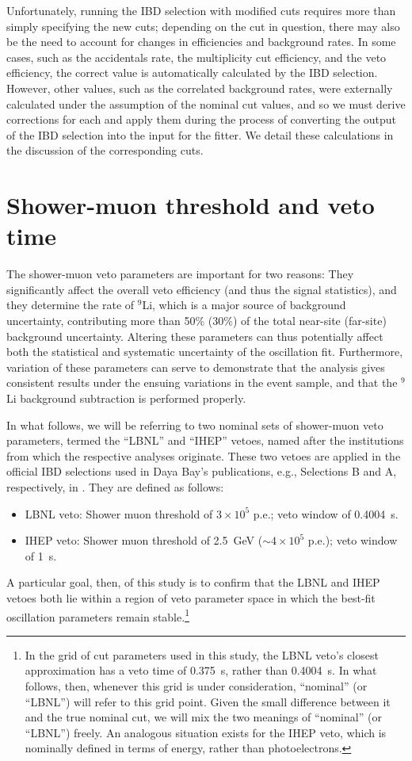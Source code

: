\documentclass[../thesis.tex]{subfiles}
\begin{document}
Unfortunately, running the IBD selection with modified cuts requires more than simply specifying the new cuts; depending on the cut in question, there may also be the need to account for changes in efficiencies and background rates. In some cases, such as the accidentals rate, the multiplicity cut efficiency, and the veto efficiency, the correct value is automatically calculated by the IBD selection. However, other values, such as the correlated background rates, were externally calculated under the assumption of the nominal cut values, and so we must derive corrections for each and apply them during the process of converting the output of the IBD selection into the input for the fitter. We detail these calculations in the discussion of the corresponding cuts.

\section{Shower-muon threshold and veto time}
\label{sec:cutVaryShowerMuon}

The shower-muon veto parameters are important for two reasons: They significantly affect the overall veto efficiency (and thus the signal statistics), and they determine the rate of $^9$Li, which is a major source of background uncertainty, contributing more than 50\% (30\%) of the total near-site (far-site) background uncertainty. Altering these parameters can thus potentially affect both the statistical and systematic uncertainty of the oscillation fit. Furthermore, variation of these parameters can serve to demonstrate that the analysis gives consistent results under the ensuing variations in the event sample, and that the $^9$Li background subtraction is performed properly.

In what follows, we will be referring to two nominal sets of shower-muon veto parameters, termed the ``LBNL'' and ``IHEP'' vetoes, named after the institutions from which the respective analyses originate. These two vetoes are applied in the official IBD selections used in Daya Bay's publications, e.g., Selections B and A, respectively, in \cite{An_2017}. They are defined as follows:
\begin{itemize}
\item LBNL veto: Shower muon threshold of $3\times10^5$ p.e.; veto window of 0.4004~s.
\item IHEP veto: Shower muon threshold of 2.5~GeV ($\sim4\times10^5$ p.e.); veto window of 1~s.
\end{itemize}
A particular goal, then, of this study is to confirm that the LBNL and IHEP vetoes both lie within a region of veto parameter space in which the best-fit oscillation parameters remain stable.\footnote{In the grid of cut parameters used in this study, the LBNL veto's closest approximation has a veto time of 0.375~s, rather than 0.4004~s. In what follows, then, whenever this grid is under consideration, ``nominal'' (or ``LBNL'') will refer to this grid point. Given the small difference between it and the true nominal cut, we will mix the two meanings of ``nominal'' (or ``LBNL'') freely. An analogous situation exists for the IHEP veto, which is nominally defined in terms of energy, rather than photoelectrons.}
\end{document}
